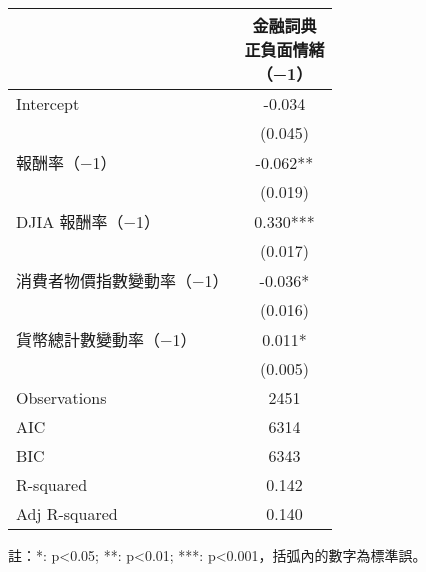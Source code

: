 \documentclass{article}
\begin{document}
    \fontsize{12pt}{14pt}\selectfont
    
    \begin{tabular}{lc}
\toprule
 & \makecell{金融詞典\\正負面情緒\\（−1）} \\
\midrule
Intercept & -0.034 \\
 & (0.045) \\
報酬率（−1） & -0.062** \\
 & (0.019) \\
DJIA 報酬率（−1） & 0.330*** \\
 & (0.017) \\
消費者物價指數變動率（−1） & -0.036* \\
 & (0.016) \\
貨幣總計數變動率（−1） & 0.011* \\
 & (0.005) \\
\midrule
Observations &   2451 \\
AIC &    6314 \\
BIC &    6343 \\
R-squared &    0.142 \\
Adj R-squared &    0.140 \\
\bottomrule
\end{tabular}

    
    \fontsize{11pt}{14pt}\selectfont
    註：*: p<0.05; **: p<0.01; ***: p<0.001，括弧內的數字為標準誤。
    
\end{document}

